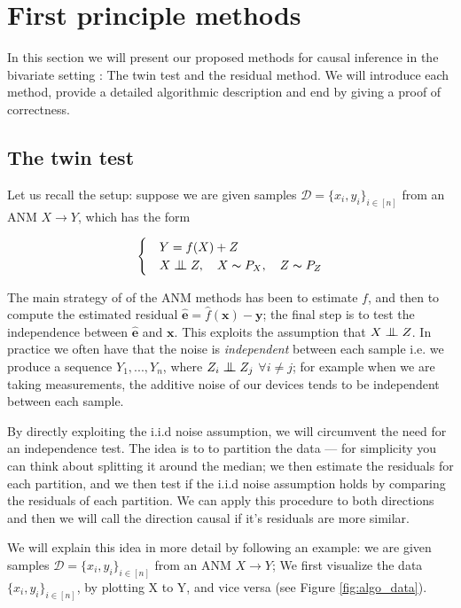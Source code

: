 
\chapter{First principle methods}


In this section we will present our proposed methods for causal inference in the 
bivariate setting : The twin test and the residual method. We will introduce each method, 
provide a detailed algorithmic description and end by giving a proof of correctness. 


\section{The twin test}

Let us recall the setup: 
suppose we are given samples $\mathcal{D} = \{x_i, y_i\}_{i \in [n]}$ from an ANM $X \rightarrow Y$, which has the form

\[
    \begin{cases} 
        & Y = f(X) + Z \\
        & X \bigCI Z,\quad X \thicksim P_X,\quad Z \thicksim P_{Z}  
     \end{cases}  
\]

The main strategy of of the ANM methods has been to estimate $f$, and then to compute the estimated
residual $\hat{\mathbf{e}} = \hat{f}(\mathbf{x}) - \mathbf{y}$; the final step is to test the independence between $\hat{\mathbf{e}}$ and $\mathbf{x}$. This exploits 
the assumption that $X \bigCI Z$. In practice we often have that the noise is \textit{independent} between each sample
i.e. we produce a sequence $Y_1, ..., Y_n$, where $Z_i \bigCI Z_j$ $\forall i \neq j$; for example when we are 
taking measurements, the additive noise of our devices tends to be independent between each sample.

By directly exploiting the i.i.d noise assumption, we will circumvent the need for an independence test. The 
idea is to to partition the data ---  for simplicity you can think about splitting it around the median; we 
then estimate the residuals for each partition, and we then test if the i.i.d noise assumption holds by comparing
the residuals of each partition. We can apply this procedure to both directions and then we will call the 
direction causal if it's residuals are more similar. 

We will explain this idea in more detail by following an example: we are given samples 
$\mathcal{D} = \{x_i, y_i\}_{i \in [n]}$ from an ANM $X \rightarrow Y$; 
We first visualize the data $\{x_i, y_i\}_{i \in [n]}$, by plotting
X to Y, and vice versa (see Figure \ref{fig:algo_data}). 

